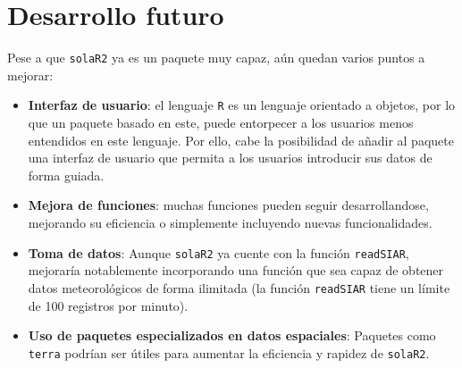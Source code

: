\section{Desarrollo futuro}
\label{sec:orgcd0352b}
Pese a que \texttt{solaR2} ya es un paquete muy capaz, aún quedan varios puntos a mejorar:
\begin{itemize}
\item \textbf{Interfaz de usuario}: el lenguaje \texttt{R} es un lenguaje orientado a objetos, por lo que un paquete basado en este, puede entorpecer a los usuarios menos entendidos en este lenguaje. Por ello, cabe la posibilidad de añadir al paquete una interfaz de usuario que permita a los usuarios introducir sus datos de forma guiada.
\item \textbf{Mejora de funciones}: muchas funciones pueden seguir desarrollandose, mejorando su eficiencia o simplemente incluyendo nuevas funcionalidades.
\item \textbf{Toma de datos}: Aunque \texttt{solaR2} ya cuente con la función \texttt{readSIAR}, mejoraría notablemente incorporando una función que sea capaz de obtener datos meteorológicos de forma ilimitada (la función \texttt{readSIAR} tiene un límite de 100 registros por minuto).
\item \textbf{Uso de paquetes especializados en datos espaciales}: Paquetes como \texttt{terra} \cite{hijmans24} podrían ser útiles para aumentar la eficiencia y rapidez de \texttt{solaR2}.
\end{itemize}
